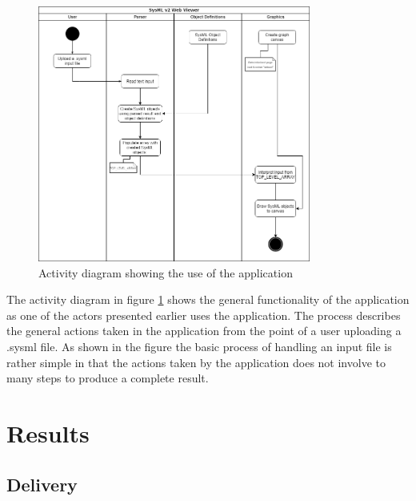 \documentclass{article}
\begin{document}
\begin{figure}[H]
    \begin{center}
        \includegraphics[width=0.8\textwidth]{Activity_diag-SysML-project.png}
        \caption{Activity diagram showing the use of the application}
        \label{activity}
    \end{center}
\end{figure}
The activity diagram in figure \ref{activity} shows the general functionality of the application as one of the actors presented earlier uses the application. The process describes the general actions taken in the application from the point of a user uploading a .sysml file. As shown in the figure the basic process of handling an input file is rather simple in that the actions taken by the application does not involve to many steps to produce a complete result. 


\newpage
\section{Results}

\subsection{Delivery}
\end{document}
